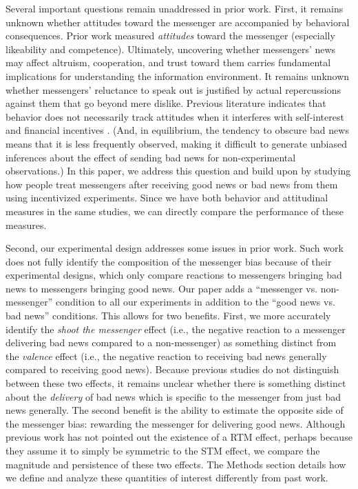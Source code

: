 Several important questions remain unaddressed in prior work. First, it
remains unknown whether attitudes toward the messenger are accompanied
by behavioral consequences. Prior work measured
\emph{attitudes} toward the messenger (especially
likeability and competence). Ultimately, uncovering whether messengers'
news may affect altruism, cooperation, and trust toward them carries
fundamental implications for understanding the information environment.
It remains unknown whether messengers' reluctance to speak out is
justified by actual repercussions against them that go beyond mere
dislike. Previous literature indicates that behavior does not
necessarily track attitudes when it interferes with self-interest and
financial incentives \citep{crano2006attitudes,lehman2002pervasive}.
(And, in equilibrium, the tendency to obscure bad news means that it is
less frequently observed, making it difficult to generate unbiased
inferences about the effect of sending bad news for non-experimental
observations.) In this paper, we address this question and build upon
\citet{john2019shooting} by studying how people treat messengers after
receiving good news or bad news from them using incentivized
experiments. Since we have both behavior and attitudinal measures in the
same studies, we can directly compare the performance of these measures.

Second, our experimental design addresses some issues in prior work.
Such work does not fully identify the composition of the messenger bias
because of their experimental designs, which only compare reactions to
messengers bringing bad news to messengers bringing good news. Our paper
adds a ``messenger vs. non-messenger'' condition to all our
experiments in addition to the ``good news vs. bad news'' conditions.
This allows for two benefits. First, we more accurately identify the
\emph{shoot the messenger} effect (i.e., the negative reaction to a
messenger delivering bad news compared to a non-messenger) as something
distinct from the \emph{valence} effect (i.e., the negative reaction to
receiving bad news generally compared to receiving good news). Because
previous studies do not distinguish between these two effects, it
remains unclear whether there is something distinct about the
\emph{delivery} of bad news which is specific to the messenger from just
bad news generally. The second benefit is the ability to estimate the
opposite side of the messenger bias: rewarding the messenger for
delivering good news. Although previous work has not pointed out the
existence of a RTM effect, perhaps because they assume it to simply be
symmetric to the STM effect, we compare the magnitude and persistence of
these two effects. The Methods section details how we define and analyze
these quantities of interest differently from past work.

